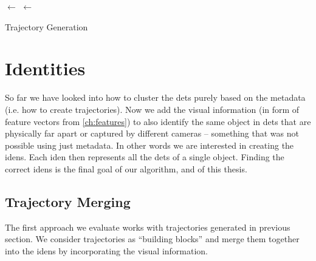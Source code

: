 \begin{algorithm}

 
 \BlankLine
 \Traj $\leftarrow$ \UnionFind{ }\;
 \Win $\leftarrow$ \Queue{ }\;
 \Return \Traj

 \caption{Trajectory Generation}
 \label{alg:trajectory_generation}
\end{algorithm}

\section{Identities}

\label{sec:generating_identities}

So far we have looked into how to cluster the \glspl{det} purely based on the metadata (i.e. how to create trajectories). Now we add the visual information (in form of feature vectors from \autoref{ch:features}) to also identify the same object in \glspl{det} that are physically far apart or captured by different cameras -- something that was not possible using just metadata. In other words we are interested in creating the \glspl{iden}. Each \gls{iden} then represents all the \glspl{det} of a single object. Finding the correct \glspl{iden} is the final goal of our algorithm, and of this thesis.

\subsection{Trajectory Merging}

The first approach we evaluate works with trajectories generated in previous section. We consider trajectories as ``building blocks'' and merge them together into the \glspl{iden} by incorporating the visual information.

